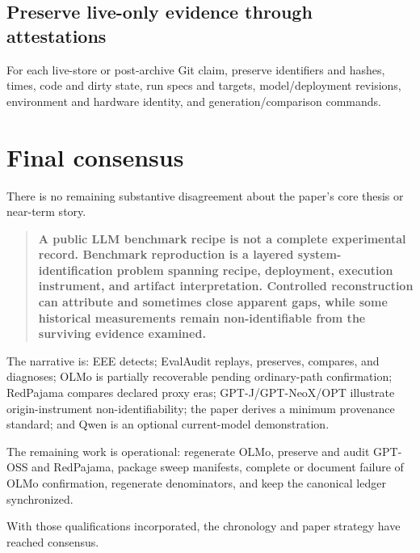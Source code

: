 \documentclass[11pt]{article}
\begin{document}
\subsection*{Preserve live-only evidence through attestations}
For each live-store or post-archive Git claim, preserve identifiers and hashes, times,
code and dirty state, run specs and targets, model/deployment revisions, environment
and hardware identity, and generation/comparison commands.

\section{Final consensus}
There is no remaining substantive disagreement about the paper's core thesis or
near-term story.

\begin{quote}\bfseries
A public LLM benchmark recipe is not a complete experimental record. Benchmark
reproduction is a layered system-identification problem spanning recipe, deployment,
execution instrument, and artifact interpretation. Controlled reconstruction can
attribute and sometimes close apparent gaps, while some historical measurements
remain non-identifiable from the surviving evidence examined.
\end{quote}

The narrative is: EEE detects; EvalAudit replays, preserves, compares, and diagnoses;
OLMo is partially recoverable pending ordinary-path confirmation; RedPajama compares
declared proxy eras; GPT-J/GPT-NeoX/OPT illustrate origin-instrument
non-identifiability; the paper derives a minimum provenance standard; and Qwen is an
optional current-model demonstration.

The remaining work is operational: regenerate OLMo, preserve and audit GPT-OSS and
RedPajama, package sweep manifests, complete or document failure of OLMo confirmation,
regenerate denominators, and keep the canonical ledger synchronized.

With those qualifications incorporated, the chronology and paper strategy have
reached consensus.
\end{document}

